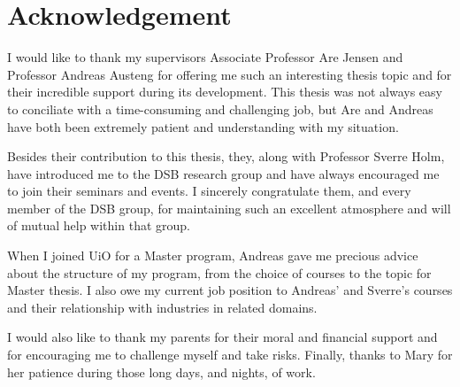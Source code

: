 \chapter*{Acknowledgement}

I would like to thank my supervisors Associate Professor Are Jensen and Professor Andreas Austeng for offering me such an interesting thesis topic and for their incredible support during its development.
This thesis was not always easy to conciliate with a time-consuming and challenging job, but Are and Andreas have both been extremely patient and understanding with my situation.

Besides their contribution to this thesis, they, along with Professor Sverre Holm, have introduced me to the DSB research group and have always encouraged me to join their seminars and events. I sincerely congratulate them, and every member of the DSB group, for maintaining such an excellent atmosphere and will of mutual help within that group.

When I joined UiO for a Master program, Andreas gave me precious advice about the structure of my program, from the choice of courses to the topic for Master thesis. I also owe my current job position to Andreas' and Sverre's courses and their relationship with industries in related domains.

I would also like to thank my parents for their moral and financial support and for encouraging me to challenge myself and take risks.
Finally, thanks to Mary for her patience during those long days, and nights, of work.